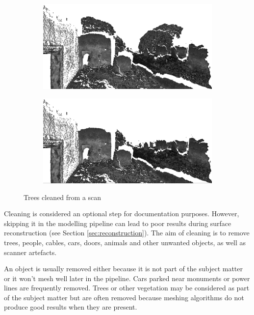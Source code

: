 \begin{figure}[ht]
	\begin{subfigure}[b]{.5\textwidth}
	  \centreing
	  \includegraphics[width=.9\linewidth]{images/dirty}
	\end{subfigure}%
	\begin{subfigure}[b]{.5\textwidth}
	  \centreing
	  \includegraphics[width=.9\linewidth]{images/clean}
	\end{subfigure}
  \caption{Trees cleaned from a scan}
  \label{fig:cleaning}
\end{figure}

Cleaning is considered an optional step for documentation purposes. However, skipping it in the modelling pipeline can lead to poor results during surface reconstruction (see Section \ref{sec:reconstruction}). The aim of cleaning is to remove trees, people, cables, cars, doors, animals and other unwanted objects, as well as scanner artefacts.

An object is usually removed either because it is not part of the subject matter or it won't mesh well later in the pipeline. Cars parked near monuments or power lines are frequently removed. Trees or other vegetation may be considered as part of the subject matter but are often removed because meshing algorithms do not produce good results when they are present.

